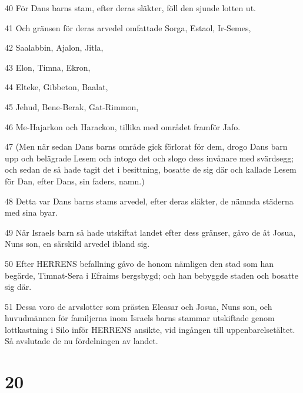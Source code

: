 \par 40 För Dans barns stam, efter deras släkter, föll den sjunde lotten ut.
\par 41 Och gränsen för deras arvedel omfattade Sorga, Estaol, Ir-Semes,
\par 42 Saalabbin, Ajalon, Jitla,
\par 43 Elon, Timna, Ekron,
\par 44 Elteke, Gibbeton, Baalat,
\par 45 Jehud, Bene-Berak, Gat-Rimmon,
\par 46 Me-Hajarkon och Harackon, tillika med området framför Jafo.
\par 47 (Men när sedan Dans barns område gick förlorat för dem, drogo Dans barn upp och belägrade Lesem och intogo det och slogo dess invånare med svärdsegg; och sedan de så hade tagit det i besittning, bosatte de sig där och kallade Lesem för Dan, efter Dans, sin faders, namn.)
\par 48 Detta var Dans barns stams arvedel, efter deras släkter, de nämnda städerna med sina byar.
\par 49 När Israels barn så hade utskiftat landet efter dess gränser, gåvo de åt Josua, Nuns son, en särskild arvedel ibland sig.
\par 50 Efter HERRENS befallning gåvo de honom nämligen den stad som han begärde, Timnat-Sera i Efraims bergsbygd; och han bebyggde staden och bosatte sig där.
\par 51 Dessa voro de arvslotter som prästen Eleasar och Josua, Nuns son, och huvudmännen för familjerna inom Israels barns stammar utskiftade genom lottkastning i Silo inför HERRENS ansikte, vid ingången till uppenbarelsetältet. Så avslutade de nu fördelningen av landet.

\chapter{20}

